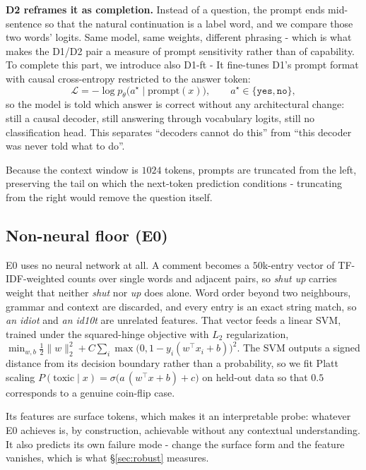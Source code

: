 \documentclass[10pt,a4paper]{article}
\begin{document}
\textbf{D2 reframes it as completion.} Instead of a question, the prompt ends mid-sentence so that the natural continuation is a label word, and we compare those two words' logits. Same model, same weights, different phrasing - which is what makes the D1/D2 pair a measure of prompt sensitivity rather than of capability.
To complete this part, we introduce also D1-ft -  It fine-tunes D1's prompt format with causal cross-entropy restricted to the answer token:
\begin{equation}
\mathcal{L} = -\log p_\theta\bigl(a^{\star}\mid \mathrm{prompt}(x)\bigr),
\qquad a^{\star}\in\{\texttt{yes},\texttt{no}\},
\end{equation}
so the model is told which answer is correct without any architectural change: still a causal decoder, still answering through vocabulary logits, still no classification head. This separates ``decoders cannot do this'' from ``this decoder was never told what to do''.

Because the context window is $1024$ tokens, prompts are truncated from the left, preserving the tail on which the next-token prediction conditions - truncating from the right would remove the question itself.

\subsection{Non-neural floor (E0)}
E0 uses no neural network at all. A comment becomes a $50$k-entry vector of TF-IDF-weighted
counts over single words and adjacent pairs, so \emph{shut up} carries weight that neither
\emph{shut} nor \emph{up} does alone. Word order beyond two neighbours, grammar and context
are discarded, and every entry is an exact string match, so \emph{an idiot} and \emph{an
id10t} are unrelated features. That vector feeds a linear SVM, trained under the squared-hinge
objective with $L_2$ regularization,
$\min_{w,b}\tfrac12\|w\|_2^2 + C\sum_i \max\bigl(0,1-y_i(w^{\top}x_i+b)\bigr)^2$.
The SVM outputs a signed distance from its decision boundary rather than a probability, so we
fit Platt scaling $P(\text{toxic}\mid x)=\sigma\bigl(a\,(w^{\top}x+b)+c\bigr)$ on held-out data
so that $0.5$ corresponds to a genuine coin-flip case.

Its features are surface tokens, which makes it an interpretable probe: whatever E0 achieves
is, by construction, achievable without any contextual understanding. It also predicts its own
failure mode - change the surface form and the feature vanishes, which is what
\S\ref{sec:robust} measures.
\end{document}

